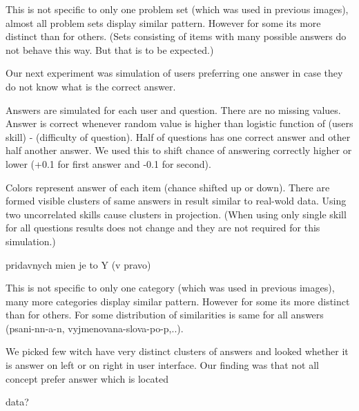 \documentclass[
  digital, %
  table,   %
  nolof,     %
  nolot,     %
  nocover
]{fithesis3}
\begin{document}


This is not specific to only one problem set (which was used in previous
images), almost all problem sets display similar pattern. However for
some its more distinct than for others. (Sets consisting of items with
many possible answers do not behave this way. But that is to be
expected.)


Our next experiment was simulation of users preferring one answer in
case they do not know what is the correct answer.

Answers are simulated for each user and question. There are no missing
values. Answer is correct whenever random value is higher than logistic
function of (users skill) - (difficulty of question). Half of questions
has one correct answer and other half another answer. We used this to
shift chance of answering correctly higher or lower (+0.1 for first
answer and -0.1 for second).


Colors represent answer of each item (chance shifted up or down). There
are formed visible clusters of same answers in result similar to
real-wold data. Using two uncorrelated skills cause clusters in
projection. (When using only single skill for all questions results does
not change and they are not required for this simulation.)

pridavnych mien je to Y (v pravo)

This is not specific to only one category (which was used in previous
images), many more categories display similar pattern. However for some
its more distinct than for others. For some distribution of similarities
is same for all answers (psani-nn-a-n, vyjmenovana-slova-po-p,..).

We picked few witch have very distinct clusters of answers and looked whether it is
answer on left or on right in user interface. Our finding was that not all concept prefer answer which is  located

data?

\end{document}

